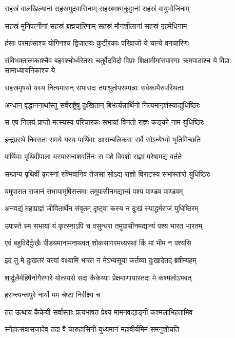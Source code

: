 \twolineshloka
{सहस्रं वालखिल्यानां सहस्रमुदवासिनाम्}
{सहस्रमश्मकुट्टानां सहस्रं वायुभोजिनाम्}


\twolineshloka
{सहस्रं मुनिपत्नीनां सहस्रं ब्रह्मचारिणाम्}
{सहस्रं मौनशीलानां सहस्रं गृहमेधिनाम्}


\twolineshloka
{हंसाः परमहंसाश्च योगिनश्च द्विजातयः}
{कुटीरकाः परिव्राजो ये चान्ये वनचारिणः}


\threelineshloka
{संविभक्तात्मकाश्चैव बहवश्चोर्ध्वरेतसः}
{चतुर्वेदविदो विप्राः शिक्षामीमांसपारगाः}
{क्रमपाठाश्च ये विप्राः सामाध्यायनिकाश्च ये}


\twolineshloka
{सहस्रमृषयो यस्य नित्यमासन् सभासदः}
{तपःश्रुतोपसम्पन्नाः सर्वकामैरुपस्थिताः}


\twolineshloka
{अन्धान् वृद्धाननाथांस्तु सर्वराष्ट्रेषु दुःखितान्}
{बिभर्त्यन्नार्थिनो नित्यमानृशंस्याद्युधिष्ठिरः}


\twolineshloka
{स एष निलयं प्राप्तो मत्स्यस्य परिचारकः}
{सभायां विनतो राज्ञः कङ्को नाम युधिष्ठिरः}


\twolineshloka
{इन्द्रप्रस्थे निवसतः समये यस्य पार्थिवाः}
{आसन्बलिकराः सर्वे सोऽन्येभ्यो भृतिमिच्छति}


\twolineshloka
{पार्थिवाः पृथिवीपाला यस्यासन्वशवर्तिनः}
{स वशे विवशो राज्ञां परेषामद्य वर्तते}


\twolineshloka
{सम्प्राप्य पृथिवीं कृत्स्नां रश्मिवानिव तेजसा}
{सोऽद्य राज्ञो विराटस्य सभास्तारो युधिष्ठिरः}


\twolineshloka
{यमुपासत राजानं सभायामृषिसत्तमाः}
{तमुपासीनमद्यान्यं पश्य पाण्डव पाण्डवम्}


\twolineshloka
{अनवद्यं महाप्राज्ञं जीवितार्थेन संवृतम्}
{दृष्ट्वा कस्य न दुःखं स्याद्धर्मराजं युधिष्ठिरम्}


\twolineshloka
{उपास्ते स्म सभायां यं कृत्स्नाऽपि च वसुन्धरा}
{तमुपासीनमद्यान्यं पश्य भारत भारतम्}


\twolineshloka
{एवं बहुविदैर्दुःखैः पीड्यमानामनाथवत्}
{शोकसागरमध्यस्थां किं मां भीम न पश्यसि}


\twolineshloka
{इदं तु मे दुःखतरं यत्त्वां वक्ष्यामि भारत}
{न मेऽभ्यसूया कर्तव्या दुःखादेतद् ब्रवीम्यहम्}


\twolineshloka
{शार्दूलैर्महिषैर्नागैरगारे योत्स्यसे सदा}
{कैकेय्याः प्रेक्षमाणायास्तदा मे कश्मलोऽभवत्}


\onelineshloka
{हसन्त्यन्तःपुरे नार्यो मम चेष्टां निरीक्ष्य च}

\twolineshloka
{तत उत्थाय कैकेयी सर्वास्ताः प्रत्यभाषत}
{प्रेक्ष्य मामनवद्याङ्गीं कश्मलाभिहतामिव}


\twolineshloka
{स्नेहात्संवासजादेव तदा वै चारुहासिनी}
{युध्यमानं महावीर्यमिमं समनुशोचति}


